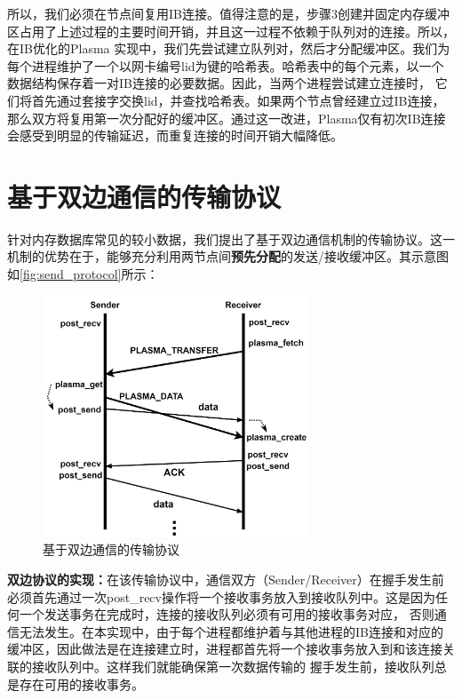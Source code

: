 所以，我们必须在节点间复用IB连接。值得注意的是，步骤3创建并固定内存缓冲区占用了上述过程的主要时间开销，并且这一过程不依赖于队列对的连接。所以，在IB优化的Plasma
实现中，我们先尝试建立队列对，然后才分配缓冲区。我们为每个进程维护了一个以网卡编号lid为键的哈希表。哈希表中的每个元素，以一个数据结构保存着一对IB连接的必要数据。因此，当两个进程尝试建立连接时，
它们将首先通过套接字交换lid，并查找哈希表。如果两个节点曾经建立过IB连接，那么双方将复用第一次分配好的缓冲区。通过这一改进，Plasma仅有初次IB连接会感受到明显的传输延迟，而重复连接的时间开销大幅降低。

\section{基于双边通信的传输协议}

针对内存数据库常见的较小数据，我们提出了基于双边通信机制的传输协议。这一机制的优势在于，能够充分利用两节点间\textbf{预先分配}的发送/接收缓冲区。其示意图如\autoref{fig:send_protocol}所示：

\begin{figure}[h]
	\centering
	\includegraphics[width=0.7\textwidth]{image/chap03/send_protocol.png}
	\caption{基于双边通信的传输协议}
	\label{fig:send_protocol}
\end{figure}

\textbf{双边协议的实现：}在该传输协议中，通信双方（Sender/Receiver）在握手发生前必须首先通过一次post\_recv操作将一个接收事务放入到接收队列中。这是因为任何一个发送事务在完成时，连接的接收队列必须有可用的接收事务对应，
否则通信无法发生。在本实现中，由于每个进程都维护着与其他进程的IB连接和对应的缓冲区，因此做法是在连接建立时，进程都首先将一个接收事务放入到和该连接关联的接收队列中。这样我们就能确保第一次数据传输的
握手发生前，接收队列总是存在可用的接收事务。

